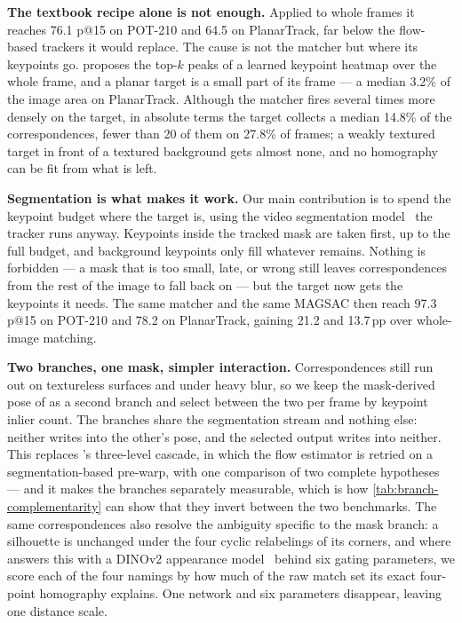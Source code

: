 \documentclass[10pt,twocolumn,letterpaper]{article}
\begin{document}
\noindent\textbf{The textbook recipe alone is not enough.}
Applied to whole frames it reaches 76.1 p@15 on POT-210 and 64.5 on PlanarTrack, far below the flow-based trackers it would replace.
The cause is not the matcher but where its keypoints go.
\loma proposes the top-$k$ peaks of a learned keypoint heatmap over the whole frame, and a planar target is a small part of its frame --- a median 3.2\% of the image area on PlanarTrack.
Although the matcher fires several times more densely on the target, in absolute terms the target collects a median 14.8\% of the correspondences, fewer than 20 of them on 27.8\% of frames; a weakly textured target in front of a textured background gets almost none, and no homography can be fit from what is left.

\noindent\textbf{Segmentation is what makes it work.}
Our main contribution is to spend the keypoint budget where the target is, using the video segmentation model~\cite{ravi2024sam2,carion2025sam} the tracker runs anyway.
Keypoints inside the tracked mask are taken first, up to the full budget, and background keypoints only fill whatever remains.
Nothing is forbidden --- a mask that is too small, late, or wrong still leaves correspondences from the rest of the image to fall back on --- but the target now gets the keypoints it needs.
The same matcher and the same MAGSAC then reach 97.3 p@15 on POT-210 and 78.2 on PlanarTrack, gaining 21.2 and 13.7\,pp over whole-image matching.

\noindent\textbf{Two branches, one mask, simpler interaction.}
Correspondences still run out on textureless surfaces and under heavy blur, so we keep the mask-derived pose of \samh as a second branch and select between the two per frame by keypoint inlier count.
The branches share the segmentation stream and nothing else: neither writes into the other's pose, and the selected output writes into neither.
This replaces \woftsam's three-level cascade, in which the flow estimator is retried on a segmentation-based pre-warp, with one comparison of two complete hypotheses --- and it makes the branches separately measurable, which is how \cref{tab:branch-complementarity} can show that they invert between the two benchmarks.
The same correspondences also resolve the ambiguity specific to the mask branch: a silhouette is unchanged under the four cyclic relabelings of its corners, and where \samh answers this with a DINOv2 appearance model~\cite{oquab2023dinov2} behind six gating parameters, we score each of the four namings by how much of the raw match set its exact four-point homography explains.
One network and six parameters disappear, leaving one distance scale.
\end{document}
